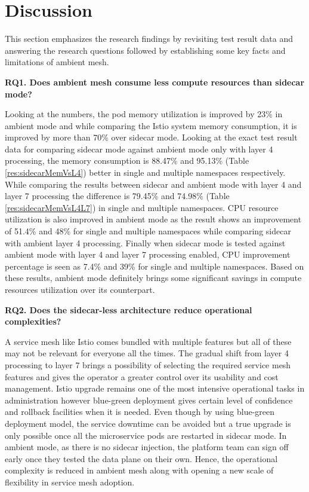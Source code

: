 \section{Discussion}
This section emphasizes the research findings by revisiting test result data and answering the research questions followed by establishing some key facts and limitations of ambient mesh.

\textbf{RQ1. Does ambient mesh consume less compute resources than sidecar mode?}

Looking at the numbers, the pod memory utilization is improved by 23\% in ambient mode and while comparing the Istio system memory consumption, it is improved by more than 70\% over sidecar mode. Looking at the exact test result data for comparing sidecar mode against ambient mode only with layer 4 processing, the memory consumption is 88.47\% and 95.13\% (Table \ref{res:sidecarMemVsL4}) better in single and multiple namespaces respectively. While comparing the results between sidecar and ambient mode with layer 4 and layer 7 processing the difference is 79.45\% and 74.98\% (Table \ref{res:sidecarMemVsL4L7}) in single and multiple namespaces. CPU resource utilization is also improved in ambient mode as the result shows an improvement of 51.4\% and 48\% for single and multiple namespaces while comparing sidecar with ambient layer 4 processing. Finally when sidecar mode is tested against ambient mode with layer 4 and layer 7 processing enabled, CPU improvement percentage is seen as 7.4\% and 39\% for single and multiple namespaces. Based on these results, ambient mode definitely brings some significant savings in compute resources utilization over its counterpart.

\textbf{RQ2. Does the sidecar-less architecture reduce operational complexities?}

A service mesh like Istio comes bundled with multiple features but all of these may not be relevant for everyone all the times. The gradual shift from layer 4 processing to layer 7 brings a possibility of selecting the required service mesh features and gives the operator a greater control over its usability and cost management. Istio upgrade remains one of the most intensive operational tasks in administration however blue-green deployment gives certain level of confidence and rollback facilities when it is needed. Even though by using blue-green deployment model, the service downtime can be avoided but a true upgrade is only possible once all the microservice pods are restarted in sidecar mode. In ambient mode, as there is no sidecar injection, the platform team can sign off early once they tested the data plane on their own. Hence, the operational complexity is reduced in ambient mesh along with opening a new scale of flexibility in service mesh adoption.

